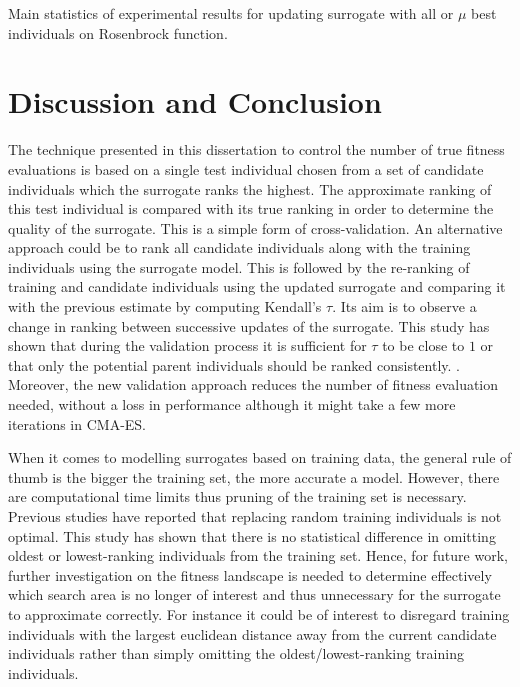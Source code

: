 \begin{table}\centering
\caption{Main statistics of experimental results for updating surrogate with all or $\mu$ best individuals on Rosenbrock function.} \label{tbl:Rosenbrock}

\end{table}

\section{Discussion and Conclusion}\label{sec:sur:disc}
The technique presented in this dissertation to control the number of true fitness evaluations is based on a single test individual chosen from a set of candidate individuals which the surrogate ranks the highest. The approximate ranking of this test individual is compared with its true ranking in order to determine the quality of the surrogate. This is a simple form of cross-validation. An alternative approach could be to rank all candidate individuals along with the training individuals  using the surrogate model. This is followed by the re-ranking of training and candidate individuals using the updated surrogate and comparing it with the previous estimate by computing Kendall's $\tau$. Its aim is to observe a change in ranking between successive updates of the surrogate. This study has shown that during the validation process it is sufficient for $\tau$ to be close to $1$ or that only the potential parent individuals should be ranked consistently. .\\
Moreover, the new validation approach reduces the number of fitness evaluation needed, without a loss in performance although it might take a few more iterations in CMA-ES. 


When it comes to modelling surrogates based on training data, the general rule of thumb is the bigger the training set, the more accurate a model. However, there are computational time limits thus pruning of the training set is necessary. Previous studies \citep{Jin05,Ratle99} have reported that replacing random training individuals  is not optimal. This study has shown that there is no statistical difference in omitting oldest or lowest-ranking individuals  from the training set. Hence, for future work, further investigation on the fitness landscape is needed to determine effectively which search area is no longer of interest and thus unnecessary for the surrogate to approximate correctly. For instance it could be of interest to disregard training individuals  with the largest euclidean distance away from the current candidate individuals rather than simply omitting the oldest/lowest-ranking training individuals. 

